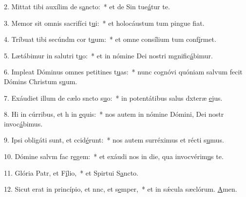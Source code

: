 2. Mittat tibi auxílim de s\uline{a}ncto:~* et de Sin tue\uline{á}tur te.\par 
3. Memor sit omnis sacrifíci t\uline{u}i:~* et holocáustum tum pingue f\uline{i}at.\par 
4. Tríbuat tibi secúndm cor t\uline{u}um:~* et omne consílium tum conf\uline{í}rmet.\par 
5. Lætábimur in salutri t\uline{u}o:~* et in nómine Dei nostri mgnific\uline{á}bimur.\par 
6. Impleat Dóminus omnes petitines t\uline{u}as:~* nunc cognóvi quóniam salvum fecit Dómins Christum s\uline{u}um.\par 
7. Exáudiet illum de cælo sncto s\uline{u}o:~* in potentátibus salus dxteræ \uline{e}jus.\par 
8. Hi in cúrribus, et h in \uline{e}quis:~* nos autem in nómine Dómini, Dei nostr invoc\uline{á}bimus.\par 
9. Ipsi obligáti sunt, et ccid\uline{é}runt:~* nos autem surréximus et récti s\uline{u}mus.\par 
10. Dómine salvm fac r\uline{e}gem:~* et exáudi nos in die, qua invocvérim\uline{u}s te.\par 
11. Glória Patr, et F\uline{í}lio,~* et Spirtui S\uline{a}ncto.\par 
12. Sicut erat in princípio, et nnc, et s\uline{e}mper,~* et in sǽcula sæclórum. \uline{A}men.\par 
